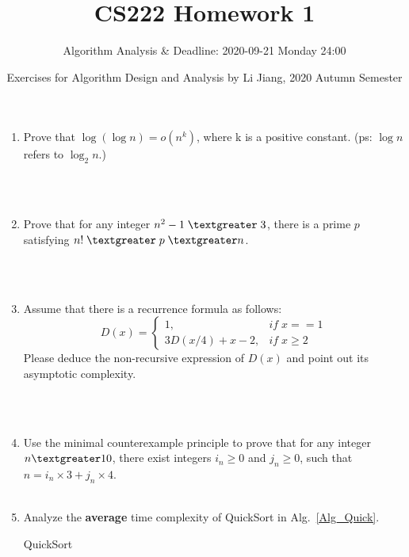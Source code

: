 \documentclass{article}
\title{CS222 Homework 1}
\author{Algorithm Analysis \& Deadline: 2020-09-21 Monday 24:00}
\date{Exercises for Algorithm Design and Analysis by Li Jiang, 2020 Autumn Semester}
\begin{document}
\maketitle

\begin{enumerate}

\item Prove that $\log (\log n) = o(n^k)$, where k is a positive constant. (ps: $\log n$ refers to $\log_2 n$.)

~\\
~\\

\item Prove that for any integer $n^2 -1\;\textgreater\;3$, there is a prime $p$ satisfying $n!\;\textgreater\;p\;\textgreater n$.

~\\
~\\
\item Assume that there is a recurrence formula as follows: 
\begin{equation*}
	D(x) = \begin{cases}
	1, &if\;x==1\\
	3D(x/4) + x - 2, &if\;x\geq2
	\end{cases}
\end{equation*}
Please deduce the non-recursive expression of $D(x)$ and point out its asymptotic complexity. 

~\\
~\\


\item Use the minimal counterexample principle to prove that for any integer $n \textgreater 10$, there exist integers $i_n\geq0$ and $j_n\geq 0$, such that $n = i_n \times 3 + j_n \times 4$.
~\\
~\\

\item  Analyze the \textbf{average} time complexity of QuickSort in Alg.~\ref{Alg_Quick}.

    \begin{minipage}[t]{0.8\textwidth}
    \begin{algorithm}[H]

      \BlankLine
      \caption{QuickSort}\label{Alg_Quick}



\end{algorithm}
\end{minipage}
\end{enumerate}
\end{document}
